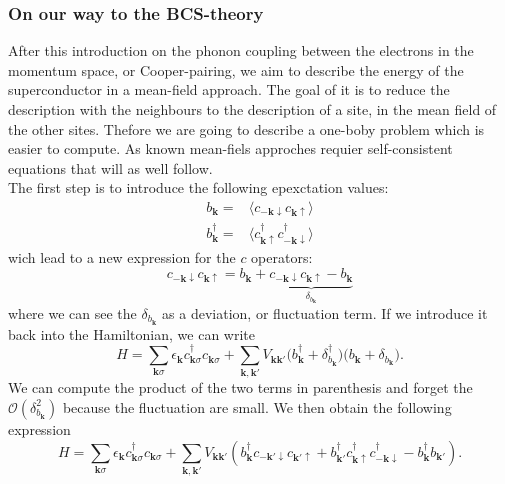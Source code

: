 \documentclass[../main.tex]{subfile}
\begin{document}
\subsubsection{On our way to the BCS-theory}
After this introduction on the phonon coupling between the electrons in the momentum space, or Cooper-pairing,
we aim to describe the energy of the superconductor in a mean-field approach. The goal of it is to reduce the description
with the neighbours to the description of a site, in the mean field of the other sites. Thefore we are going to describe 
a one-boby problem which is easier to compute. As known mean-fiels approches requier self-consistent equations that will as well follow.\\

The first step is to introduce the following epexctation values:
\begin{align}
    b_{\bm{k}} = &\langle c_{-\bm{k}\downarrow}c_{\bm{k}\uparrow}\rangle \label{eq:ExpectBCS} \\
    b_{\bm{k}}^{\dagger} = &\langle c_{\bm{k}\uparrow}^{\dagger}c_{-\bm{k}\downarrow}^{\dagger}\rangle  \label{eq:ExpectBCSDag}
\end{align}
wich lead to a new expression for the $c$ operators:
\begin{equation}
    c_{-\bm{k}\downarrow}c_{\bm{k}\uparrow} = b_{\bm{k}} + \underbrace{c_{-\bm{k}\downarrow}c_{\bm{k}\uparrow} - b_{\bm{k}}}_{\delta_{b_{\bm{k}}}}
\end{equation}
where we can see the $\delta_{b_{\bm{k}}}$ as a deviation, or fluctuation term. If we introduce it back into the Hamiltonian, we can write
\[
    H = \sum_{\bm{k}\sigma} \epsilon_{\bm{k}} c_{\bm{k}\sigma}^{\dagger}c_{\bm{k}\sigma} + \sum_{\bm{k},\bm{k}'} V_{\bm{k}\bm{k}'} \bigl( b_{\bm{k}}^{\dagger} + \delta_{b_{\bm{k}}}^{\dagger}\bigr)\bigl( b_{\bm{k}} + \delta_{b_{\bm{k}}}\bigr).
\]
We can compute the product of the two terms in parenthesis and forget the $\mathcal{O}\left(\delta_{b_{\bm{k}}}^2\right)$ because the fluctuation are small. We then obtain the following expression
\[
    H = \sum_{\bm{k}\sigma} \epsilon_{\bm{k}} c_{\bm{k}\sigma}^{\dagger}c_{\bm{k}\sigma} + \sum_{\bm{k},\bm{k}'} V_{\bm{k}\bm{k}'} \left( b_{\bm{k}}^{\dagger}c_{-\bm{k}'\downarrow}c_{\bm{k}'\uparrow}  + b_{\bm{k}'}^{\dagger} c_{\bm{k}\uparrow} ^{\dagger}c_{-\bm{k}\downarrow}^{\dagger} -  b_{\bm{k}}^{\dagger} b_{\bm{k}'}\right).
\]
\end{document}
